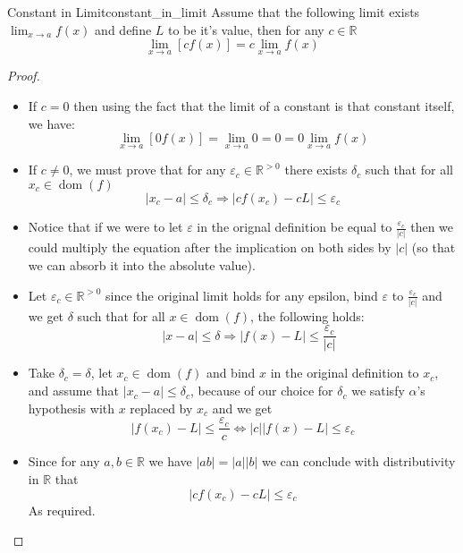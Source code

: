\begin{proposition}{Constant in Limit}{constant_in_limit}
  Assume that the following limit exists $\lim_{x\to a} f\left(x\right)$ and define $L$ to be it's value, then for any $c \in \mathbb{R}$ 
  \[
  \lim_{x \to a} \left[ c f\left(x\right) \right] = c \lim_{x\to a} f\left(x\right)
  \]
\end{proposition}

\begin{proof}
\begin{itemize}
  \item If $c = 0$ then using the fact that the limit of a constant is that constant itself, we have:
    \[
      \lim_{x \to a} \left[ 0 f\left(x\right)  \right] = \lim_{x\to a} 0 = 0 = 0 \lim_{x\to a}f\left(x\right)
    \]
  \item If $c \neq 0$, we must prove that for any $\varepsilon _{c} \in \mathbb{R} ^{ > 0}$ there exists $\delta_{c}$ such that for all $x_{c} \in \operatorname{dom }\left(f\right)$ 
    \[
    \left| x_{c}  -  a \right| \le \delta_{c} \Rightarrow \left| c f\left(x_{c}\right)  -  c L \right| \le \varepsilon_{c}
    \]
  \item Notice that if we were to let $\varepsilon$ in the orignal definition be equal to $\frac{\varepsilon _{c}}{ \left| c \right|}$ then we could multiply the equation after the implication on both sides by $ \left| c \right|$ (so that we can absorb it into the absolute value).
  \item Let $\varepsilon_{c} \in \mathbb{R} ^{> 0}$ since the original limit holds for any epsilon, bind $\varepsilon$ to $\frac{\varepsilon _{c}}{ \left| c \right|}$ and we get $\delta$ such that for all $x \in \operatorname{dom }\left(f\right)$, the following holds:
    \[
      \quad \left| x  -  a \right| \le \delta \Rightarrow \left| f\left(x\right)  -  L \right| \le \frac{\varepsilon _{c}}{ \left| c \right|} \tag{$\alpha$}
    \]
  \item Take $\delta_{c} = \delta$, let $x_{c} \in \operatorname{dom }\left(f\right)$ and bind $x$ in the original definition to $x_{c}$, and assume that $ \left| x_{c}  -  a \right|\le \delta_{c}$, because of our choice for $\delta_{c}$ we satisfy $\alpha$'s hypothesis with $x$ replaced by $x _{c}$ and we get
    \[
    \left| f\left(x_{c}\right)  -  L \right| \le \frac{\varepsilon_{c}}{c} \Leftrightarrow \left| c \right| \left| f\left(x\right)  -  L \right| \le \varepsilon_{c}
    \]
    \item Since for any $a, b \in \mathbb{R}$ we have $ \left|  a b \right|= \left| a \right| \left|  b \right|$ we can conclude with distributivity in $ \mathbb{R}$ that
      \[
      \left| c f\left(x _{c}\right)  -  c L \right| \le \varepsilon_{c}
      \]
     As required.
\end{itemize}
\end{proof}
